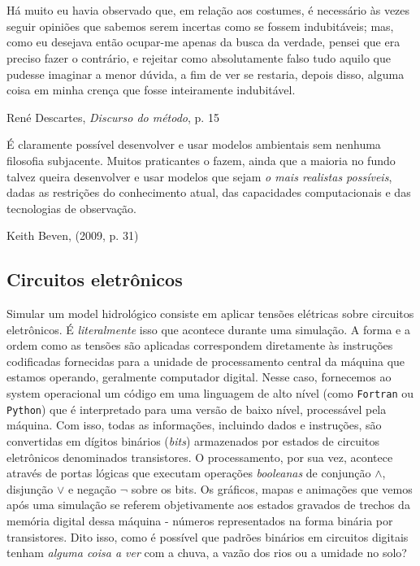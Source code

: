 \documentclass[./main.tex]{subfiles}
\begin{document}
\chapter{\chapEpis} \label{chap:episteme}

\setlength{\parskip}{0mm}

\epigraph{\small{Há muito eu havia observado que, em relação aos costumes, é necessário às vezes seguir opiniões que sabemos serem incertas como se fossem indubitáveis; mas, como eu desejava então ocupar-me apenas da busca da verdade, pensei que era preciso fazer o contrário, e rejeitar como absolutamente falso tudo aquilo que pudesse imaginar a menor dúvida, a fim de ver se restaria, depois disso, alguma coisa em minha crença que fosse inteiramente indubitável.}}{René Descartes, \textit{Discurso do método}, p. 15 \cite{descartes2008discurso}}

\epigraph{\small{É claramente possível desenvolver e usar modelos ambientais sem nenhuma filosofia subjacente. Muitos praticantes o fazem, ainda que a maioria no fundo talvez queira desenvolver e usar modelos que sejam \textit{o mais realistas possíveis}, dadas as restrições do conhecimento atual, das capacidades computacionais e das tecnologias de observação.}}{Keith Beven, (2009, p. 31) \cite{Beven2009}}

\setlength{\parskip}{\myparskip}

\section{Circuitos eletrônicos}\label{sec:epis:intro}

\par Simular um \gls{model} hidrológico consiste em aplicar tensões elétricas sobre circuitos eletrônicos. É \textit{literalmente} isso que acontece durante uma simulação. A forma e a ordem como as tensões são aplicadas correspondem diretamente às instruções codificadas fornecidas para a unidade de processamento central da máquina que estamos operando, geralmente computador digital. Nesse caso, fornecemos ao \gls{system} operacional um código em uma linguagem de alto nível (como \texttt{Fortran} ou \texttt{Python}) que é interpretado para uma versão de baixo nível, processável pela máquina. Com isso, todas as informações, incluindo dados e instruções, são convertidas em dígitos binários (\textit{bits}) armazenados por estados de circuitos eletrônicos denominados transistores. O processamento, por sua vez, acontece através de portas lógicas que executam operações \textit{booleanas} de conjunção $\land$, disjunção $\lor$ e negação $\neg$ sobre os bits. Os gráficos, mapas e animações que vemos após uma simulação se referem objetivamente aos estados gravados de trechos da memória digital dessa máquina - números representados na forma binária por transistores. Dito isso, como é possível que padrões binários em circuitos digitais tenham \textit{alguma coisa a ver} com a chuva, a vazão dos rios ou a umidade no solo?
\end{document}
